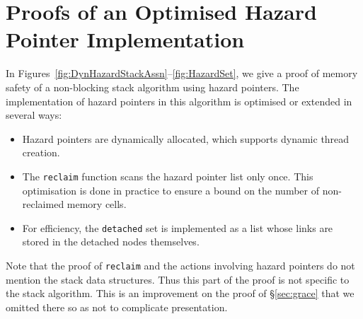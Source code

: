 
\newcommand{\myhp}{{\sf myhp}}
\newcommand{\HPL}{\texttt{HPL}}
\newcommand{\lsh}{{\sf lsh}}
\newcommand{\hpr}{{\sf hpr}}
\newcommand{\snapshotlist}{{\sf snapshot}}
\newcommand{\img}{{\it img}}
\newcommand{\detach}{{\it detached}}

\section{Proofs of an Optimised Hazard Pointer Implementation
\label{sec:ProofsHazard}}

In Figures~\ref{fig:DynHazardStackAssn}--\ref{fig:HazardSet}, we give a proof of
memory safety of a non-blocking stack algorithm using hazard pointers. The
implementation of hazard pointers in this algorithm is optimised or extended in
several ways:
\begin{itemize}
\item Hazard pointers are dynamically allocated, which supports dynamic thread
  creation.
\item The \texttt{reclaim} function scans the hazard pointer list only once.
  This optimisation is done in practice to ensure a bound on the number of
  non-reclaimed memory cells.
\item For efficiency, the {\tt detached} set is implemented as a list whose
  links are stored in the detached nodes themselves.
\end{itemize}
Note that the proof of {\tt reclaim} and the actions involving hazard pointers
do not mention the stack data structures. Thus this part of the proof is not
specific to the stack algorithm. This is an improvement on the proof of
\S\ref{sec:grace} that we omitted there so as not to complicate presentation.



